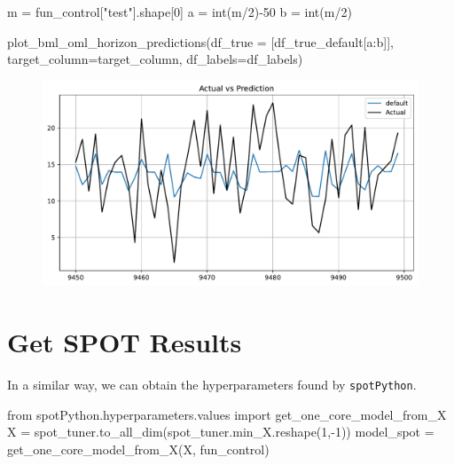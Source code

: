 \documentclass[
  letterpaper,
  DIV=11,
  numbers=noendperiod]{scrreprt}
\newenvironment{Shaded}{\begin{snugshade}}{\end{snugshade}}
\newcommand{\BuiltInTok}[1]{\textcolor[rgb]{0.00,0.23,0.31}{#1}}
\newcommand{\DecValTok}[1]{\textcolor[rgb]{0.68,0.00,0.00}{#1}}
\newcommand{\ImportTok}[1]{\textcolor[rgb]{0.00,0.46,0.62}{#1}}
\newcommand{\NormalTok}[1]{\textcolor[rgb]{0.00,0.23,0.31}{#1}}
\newcommand{\OperatorTok}[1]{\textcolor[rgb]{0.37,0.37,0.37}{#1}}
\newcommand{\StringTok}[1]{\textcolor[rgb]{0.13,0.47,0.30}{#1}}
\begin{document}
\begin{Shaded}
\begin{Highlighting}[]
\NormalTok{m }\OperatorTok{=}\NormalTok{ fun\_control[}\StringTok{"test"}\NormalTok{].shape[}\DecValTok{0}\NormalTok{]}
\NormalTok{a }\OperatorTok{=} \BuiltInTok{int}\NormalTok{(m}\OperatorTok{/}\DecValTok{2}\NormalTok{)}\OperatorTok{{-}}\DecValTok{50}
\NormalTok{b }\OperatorTok{=} \BuiltInTok{int}\NormalTok{(m}\OperatorTok{/}\DecValTok{2}\NormalTok{)}
\end{Highlighting}
\end{Shaded}

\begin{Shaded}
\begin{Highlighting}[]
\NormalTok{plot\_bml\_oml\_horizon\_predictions(df\_true }\OperatorTok{=}\NormalTok{ [df\_true\_default[a:b]], target\_column}\OperatorTok{=}\NormalTok{target\_column,  df\_labels}\OperatorTok{=}\NormalTok{df\_labels)}
\end{Highlighting}
\end{Shaded}

\begin{figure}[H]

{\centering \includegraphics{13_spot_hpt_river_files/figure-pdf/cell-31-output-1.pdf}

}

\end{figure}

\hypertarget{get-spot-results-1}{%
\section{Get SPOT Results}\label{get-spot-results-1}}

In a similar way, we can obtain the hyperparameters found by
\texttt{spotPython}.

\begin{Shaded}
\begin{Highlighting}[]
\ImportTok{from}\NormalTok{ spotPython.hyperparameters.values }\ImportTok{import}\NormalTok{ get\_one\_core\_model\_from\_X}
\NormalTok{X }\OperatorTok{=}\NormalTok{ spot\_tuner.to\_all\_dim(spot\_tuner.min\_X.reshape(}\DecValTok{1}\NormalTok{,}\OperatorTok{{-}}\DecValTok{1}\NormalTok{))}
\NormalTok{model\_spot }\OperatorTok{=}\NormalTok{ get\_one\_core\_model\_from\_X(X, fun\_control)}
\end{Highlighting}
\end{Shaded}
\end{document}
